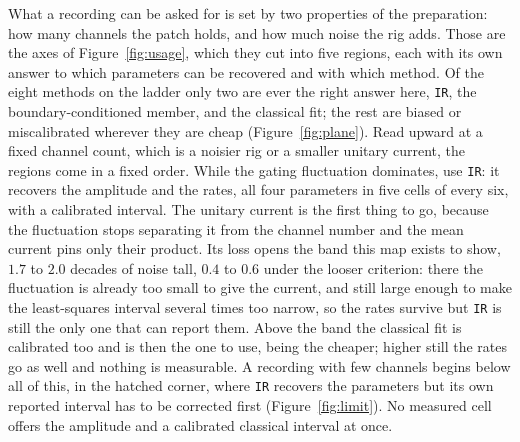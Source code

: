 What a recording can be asked for is set by two properties of the preparation: how many channels
the patch holds, and how much noise the rig adds. Those are the axes of Figure~\ref{fig:usage},
which they cut into five regions, each with its own answer to which parameters can be recovered
and with which method. Of the eight methods on the ladder only two are ever the right answer here,
\texttt{IR}, the boundary-conditioned member, and the classical fit; the rest are biased or
miscalibrated wherever they are cheap (Figure~\ref{fig:plane}). Read upward at a fixed channel
count, which is a noisier rig or a smaller unitary current, the regions come in a fixed order.
While the gating fluctuation dominates, use \texttt{IR}: it recovers the amplitude and the rates,
all four parameters in five cells of every six, with a calibrated interval. The unitary current is
the first thing to go, because the fluctuation stops separating it from the channel number and the
mean current pins only their product. Its loss opens the band this map exists to show, $1.7$ to $2.0$ decades of noise tall, $0.4$ to $0.6$ under the looser criterion: there the fluctuation is already too small to give the current, and still
large enough to make the least-squares interval several times too narrow, so the rates survive but
\texttt{IR} is still the only one that can report them. Above the band the classical fit is
calibrated too and is then the one to use, being the cheaper; higher still the rates go as well
and nothing is measurable. A recording with few channels begins below all of this, in the hatched
corner, where \texttt{IR} recovers the parameters but its own reported interval has to be
corrected first (Figure~\ref{fig:limit}). No measured cell offers the amplitude and a calibrated
classical interval at once.

